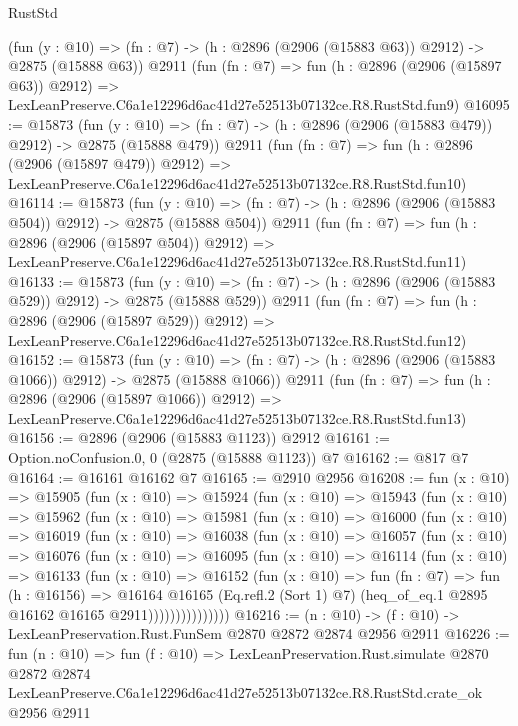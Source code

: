 \begin{lexlean}{RustStd}
\begin{coremodule}
    (fun (y : @10) => (fn : @7) -> (h : @2896 (@2906 (@15883 @63)) @2912) -> @2875 (@15888 @63))
    @2911
    (fun (fn : @7) =>
    fun (h : @2896 (@2906 (@15897 @63)) @2912) =>
    LexLeanPreserve.C6a1e12296d6ac41d27e52513b07132ce.R8.RustStd.fun9)
@16095 := @15873
    (fun (y : @10) => (fn : @7) -> (h : @2896 (@2906 (@15883 @479)) @2912) -> @2875 (@15888 @479))
    @2911
    (fun (fn : @7) =>
    fun (h : @2896 (@2906 (@15897 @479)) @2912) =>
    LexLeanPreserve.C6a1e12296d6ac41d27e52513b07132ce.R8.RustStd.fun10)
@16114 := @15873
    (fun (y : @10) => (fn : @7) -> (h : @2896 (@2906 (@15883 @504)) @2912) -> @2875 (@15888 @504))
    @2911
    (fun (fn : @7) =>
    fun (h : @2896 (@2906 (@15897 @504)) @2912) =>
    LexLeanPreserve.C6a1e12296d6ac41d27e52513b07132ce.R8.RustStd.fun11)
@16133 := @15873
    (fun (y : @10) => (fn : @7) -> (h : @2896 (@2906 (@15883 @529)) @2912) -> @2875 (@15888 @529))
    @2911
    (fun (fn : @7) =>
    fun (h : @2896 (@2906 (@15897 @529)) @2912) =>
    LexLeanPreserve.C6a1e12296d6ac41d27e52513b07132ce.R8.RustStd.fun12)
@16152 := @15873
    (fun (y : @10) => (fn : @7) -> (h : @2896 (@2906 (@15883 @1066)) @2912) -> @2875 (@15888 @1066))
    @2911
    (fun (fn : @7) =>
    fun (h : @2896 (@2906 (@15897 @1066)) @2912) =>
    LexLeanPreserve.C6a1e12296d6ac41d27e52513b07132ce.R8.RustStd.fun13)
@16156 := @2896 (@2906 (@15883 @1123)) @2912
@16161 := Option.noConfusion.{0, 0} (@2875 (@15888 @1123)) @7
@16162 := @817 @7
@16164 := @16161 @16162 @7
@16165 := @2910 @2956
@16208 := fun (x : @10) =>
  @15905
    (fun (x : @10) =>
    @15924
      (fun (x : @10) =>
      @15943
        (fun (x : @10) =>
        @15962
          (fun (x : @10) =>
          @15981
            (fun (x : @10) =>
            @16000
              (fun (x : @10) =>
              @16019
                (fun (x : @10) =>
                @16038
                  (fun (x : @10) =>
                  @16057
                    (fun (x : @10) =>
                    @16076
                      (fun (x : @10) =>
                      @16095
                        (fun (x : @10) =>
                        @16114
                          (fun (x : @10) =>
                          @16133
                            (fun (x : @10) =>
                            @16152
                              (fun (x : @10) =>
                              fun (fn : @7) =>
                              fun (h : @16156) =>
                              @16164
                                @16165
                                (Eq.refl.{2} (Sort 1) @7)
                                (heq_of_eq.{1} @2895 @16162 @16165 @2911)))))))))))))))
@16216 := (n : @10) -> (f : @10) -> LexLeanPreservation.Rust.FunSem @2870 @2872 @2874 @2956 @2911
@16226 := fun (n : @10) =>
  fun (f : @10) =>
  LexLeanPreservation.Rust.simulate
    @2870
    @2872
    @2874
    LexLeanPreserve.C6a1e12296d6ac41d27e52513b07132ce.R8.RustStd.crate_ok
    @2956
    @2911
\end{coremodule}
\end{lexlean}
